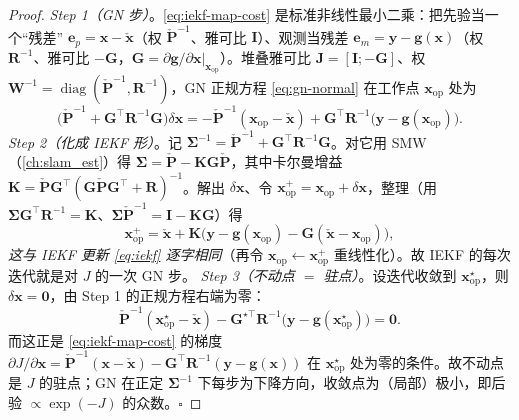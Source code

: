 \begin{proof}
\emph{Step 1（GN 步）}。\cref{eq:iekf-map-cost} 是标准非线性最小二乘：把先验当一个“残差” $\mathbf{e}_p=\mathbf{x}-\check{\mathbf{x}}$（权 $\check{\mathbf{P}}^{-1}$、雅可比 $\mathbf{I}$）、观测当残差 $\mathbf{e}_m=\mathbf{y}-\mathbf{g}(\mathbf{x})$（权 $\mathbf{R}^{-1}$、雅可比 $-\mathbf{G}$，$\mathbf{G}=\partial\mathbf{g}/\partial\mathbf{x}|_{\mathbf{x}_{\mathrm{op}}}$）。堆叠雅可比 $\mathbf{J}=[\mathbf{I};-\mathbf{G}]$、权 $\mathbf{W}^{-1}=\operatorname{diag}(\check{\mathbf{P}}^{-1},\mathbf{R}^{-1})$，GN 正规方程 \cref{eq:gn-normal} 在工作点 $\mathbf{x}_{\mathrm{op}}$ 处为
\[
  \big(\check{\mathbf{P}}^{-1}+\mathbf{G}^\top\mathbf{R}^{-1}\mathbf{G}\big)\delta\mathbf{x}
  =-\check{\mathbf{P}}^{-1}(\mathbf{x}_{\mathrm{op}}-\check{\mathbf{x}})+\mathbf{G}^\top\mathbf{R}^{-1}\big(\mathbf{y}-\mathbf{g}(\mathbf{x}_{\mathrm{op}})\big).
\]
\emph{Step 2（化成 IEKF 形）}。记 $\boldsymbol{\Sigma}^{-1}=\check{\mathbf{P}}^{-1}+\mathbf{G}^\top\mathbf{R}^{-1}\mathbf{G}$。对它用 SMW（\cref{ch:slam_est}）得 $\boldsymbol{\Sigma}=\check{\mathbf{P}}-\mathbf{K}\mathbf{G}\check{\mathbf{P}}$，其中卡尔曼增益 $\mathbf{K}=\check{\mathbf{P}}\mathbf{G}^\top(\mathbf{G}\check{\mathbf{P}}\mathbf{G}^\top+\mathbf{R})^{-1}$。解出 $\delta\mathbf{x}$、令 $\mathbf{x}_{\mathrm{op}}^{+}=\mathbf{x}_{\mathrm{op}}+\delta\mathbf{x}$，整理（用 $\boldsymbol{\Sigma}\mathbf{G}^\top\mathbf{R}^{-1}=\mathbf{K}$、$\boldsymbol{\Sigma}\check{\mathbf{P}}^{-1}=\mathbf{I}-\mathbf{K}\mathbf{G}$）得
\[
  \mathbf{x}_{\mathrm{op}}^{+}=\check{\mathbf{x}}+\mathbf{K}\big(\mathbf{y}-\mathbf{g}(\mathbf{x}_{\mathrm{op}})-\mathbf{G}(\check{\mathbf{x}}-\mathbf{x}_{\mathrm{op}})\big),
\]
\emph{这与 IEKF 更新 \cref{eq:iekf} 逐字相同}（再令 $\mathbf{x}_{\mathrm{op}}\leftarrow\mathbf{x}_{\mathrm{op}}^{+}$ 重线性化）。故 IEKF 的每次迭代就是对 $J$ 的一次 GN 步。
\emph{Step 3（不动点 $=$ 驻点）}。设迭代收敛到 $\mathbf{x}_{\mathrm{op}}^\star$，则 $\delta\mathbf{x}=\mathbf{0}$，由 Step 1 的正规方程右端为零：
\[
  \check{\mathbf{P}}^{-1}(\mathbf{x}_{\mathrm{op}}^\star-\check{\mathbf{x}})-\mathbf{G}^{\star\top}\mathbf{R}^{-1}\big(\mathbf{y}-\mathbf{g}(\mathbf{x}_{\mathrm{op}}^\star)\big)=\mathbf{0}.
\]
而这正是 \cref{eq:iekf-map-cost} 的梯度 $\partial J/\partial\mathbf{x}=\check{\mathbf{P}}^{-1}(\mathbf{x}-\check{\mathbf{x}})-\mathbf{G}^\top\mathbf{R}^{-1}(\mathbf{y}-\mathbf{g}(\mathbf{x}))$ 在 $\mathbf{x}_{\mathrm{op}}^\star$ 处为零的条件。故不动点是 $J$ 的驻点；GN 在正定 $\boldsymbol{\Sigma}^{-1}$ 下每步为下降方向，收敛点为（局部）极小，即后验 $\propto\exp(-J)$ 的众数。\hfill$\square$
\end{proof}

